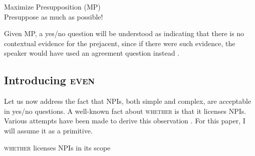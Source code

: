 \documentclass[output=paper,colorlinks,citecolor=brown]{langscibook}
\begin{document}
\ea
Maximize Presupposition (MP)\\
Presuppose as much as possible!
\z

Given MP, a yes/no question will be understood as indicating that there is no contextual evidence for the prejacent, since if there were such evidence, the speaker would have used an agreement question instead \citep{sauerland2008implicated}.






\subsection{Introducing \textsc{even} }

Let us now address the fact that NPIs, both simple and complex, are acceptable in yes/no questions. A well-known fact about \textsc{whether} is that it licenses NPIs. Various attempts have been made to derive this observation \citep[cf.][]{Ladusaw:1979, krifka1991some, krifka1995semantics, rooij2003negative, guerzonisharvit2007question, guerzonisharvit2014whether, nicolae2015questions, roelofsen2018npis, roelofsenjeong2022focused}. For this paper, I will assume it as a primitive. 

\ea \label{whethernpi}
\textsc{whether} licenses NPIs in its scope
\z
\end{document}
